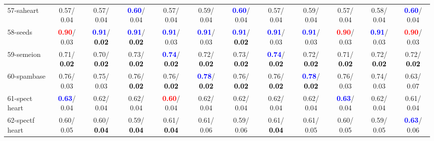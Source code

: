 \begin{table}[h]
\begin{center}
{\begin{tabular}{lc|c|c|c|c|c|c|c|c|c|c}
57-saheart &   0.57/  0.04 &   0.57/  0.04 & \textcolor{blue}{\textbf{  0.60}}/  0.04 &   0.57/  0.04 &   0.59/  0.04 & \textcolor{blue}{\textbf{  0.60}}/  0.04 &   0.57/  0.04 &   0.59/  0.04 &   0.57/  0.04 &   0.58/  0.04 & \textcolor{blue}{\textbf{  0.60}}/  0.04 \\
58-seeds & \textcolor{red}{\textbf{  0.90}}/  0.03 & \textcolor{blue}{\textbf{  0.91}}/\textcolor{black}{\textbf{  0.02}} & \textcolor{blue}{\textbf{  0.91}}/\textcolor{black}{\textbf{  0.02}} & \textcolor{blue}{\textbf{  0.91}}/  0.03 & \textcolor{blue}{\textbf{  0.91}}/  0.03 & \textcolor{blue}{\textbf{  0.91}}/\textcolor{black}{\textbf{  0.02}} & \textcolor{blue}{\textbf{  0.91}}/  0.03 & \textcolor{blue}{\textbf{  0.91}}/  0.03 & \textcolor{red}{\textbf{  0.90}}/  0.03 & \textcolor{blue}{\textbf{  0.91}}/  0.03 & \textcolor{red}{\textbf{  0.90}}/  0.03 \\
59-semeion &   0.71/\textcolor{black}{\textbf{  0.02}} &   0.70/\textcolor{black}{\textbf{  0.02}} &   0.73/\textcolor{black}{\textbf{  0.02}} & \textcolor{blue}{\textbf{  0.74}}/\textcolor{black}{\textbf{  0.02}} &   0.72/\textcolor{black}{\textbf{  0.02}} &   0.73/\textcolor{black}{\textbf{  0.02}} & \textcolor{blue}{\textbf{  0.74}}/\textcolor{black}{\textbf{  0.02}} &   0.72/\textcolor{black}{\textbf{  0.02}} &   0.71/\textcolor{black}{\textbf{  0.02}} &   0.72/\textcolor{black}{\textbf{  0.02}} &   0.72/\textcolor{black}{\textbf{  0.02}} \\
60-spambase &   0.76/  0.03 &   0.75/  0.03 &   0.76/\textcolor{black}{\textbf{  0.02}} &   0.76/\textcolor{black}{\textbf{  0.02}} & \textcolor{blue}{\textbf{  0.78}}/\textcolor{black}{\textbf{  0.02}} &   0.76/\textcolor{black}{\textbf{  0.02}} &   0.76/\textcolor{black}{\textbf{  0.02}} & \textcolor{blue}{\textbf{  0.78}}/\textcolor{black}{\textbf{  0.02}} &   0.76/  0.03 &   0.74/  0.03 &   0.63/  0.07 \\ \hline
61-spect heart & \textcolor{blue}{\textbf{  0.63}}/  0.04 &   0.62/  0.04 &   0.62/  0.04 & \textcolor{red}{\textbf{  0.60}}/  0.04 &   0.62/  0.04 &   0.62/  0.04 &   0.62/  0.04 &   0.62/  0.04 & \textcolor{blue}{\textbf{  0.63}}/  0.04 &   0.62/  0.04 &   0.61/  0.04 \\
62-spectf heart &   0.60/  0.05 &   0.60/\textcolor{black}{\textbf{  0.04}} &   0.59/\textcolor{black}{\textbf{  0.04}} &   0.61/\textcolor{black}{\textbf{  0.04}} &   0.61/  0.06 &   0.59/  0.06 &   0.61/\textcolor{black}{\textbf{  0.04}} &   0.61/  0.05 &   0.60/  0.05 &   0.59/  0.05 & \textcolor{blue}{\textbf{  0.63}}/  0.06 \\

\end{tabular}}
\end{center}
\end{table}
